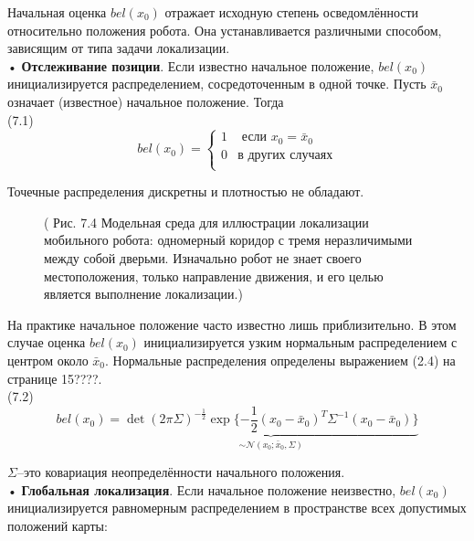 \documentclass[10pt,a4paper]{article}
\begin{document}
Начальная оценка $bel(x_0)$ отражает исходную степень осведомлённости относительно положения робота.
Она устанавливается различными способом, зависящим от типа задачи локализации.\\

• \textbf{Отслеживание позиции}. Если известно начальное положение, $bel(x_0)$ инициализируется распределением, сосредоточенным в одной точке. Пусть $\bar{x}_0$ означает (известное) начальное положение. Тогда\\

(7.1)
\begin{equation*}
bel(x_0)=\left\{
\begin{array}{ll}
1 & \mbox{ если } x_0=\bar{x}_0\\
0 & \mbox{в других случаях}\\
\end{array}
\right.
\end{equation*}

Точечные распределения дискретны и плотностью не обладают.  

\begin{figure}[H]
	\caption{ (  Рис. 7.4 Модельная среда для иллюстрации локализации мобильного робота: одномерный коридор с тремя неразличимыми между собой дверьми. Изначально робот не знает своего местоположения, только направление движения, и его целью является выполнение локализации.)}
	\label{fig:74orig}
\end{figure}

На практике начальное положение часто известно лишь приблизительно. В этом случае оценка $bel(x_0)$  инициализируется узким нормальным распределением с центром около $\bar{x}_0$. Нормальные распределения определены выражением (2.4) на странице 15????.\\

(7.2)
$$bel(x_0)=\underbrace{\det(2\pi\varSigma)^{-\frac{1}{2}}\exp\{-\frac{1}{2}(x_0-\bar{x}_0)^T\varSigma^{-1}(x_0-\bar{x}_0)\}}_{\sim \mathcal{N}(x_0;\bar{x}_0,\varSigma)}$$

$\varSigma$–это ковариация неопределённости начального положения.\\

• \textbf{Глобальная локализация}. Если начальное положение неизвестно, $bel(x_0)$ инициализируется равномерным распределением в пространстве всех допустимых положений карты:\\
\end{document}

